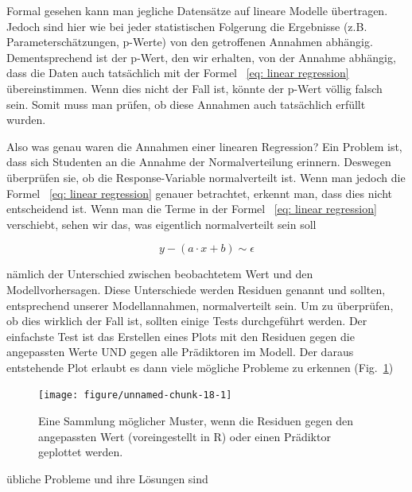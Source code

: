 \documentclass[a4paper,twoside]{tufte-book}\usepackage[]{graphicx}\usepackage[]{color}
\begin{document}
Formal gesehen kann man jegliche Datensätze auf lineare Modelle übertragen. Jedoch sind hier wie bei jeder statistischen Folgerung die Ergebnisse (z.B. Parameterschätzungen, p-Werte) von den getroffenen Annahmen abhängig. Dementsprechend ist der p-Wert, den wir erhalten, von der Annahme abhängig, dass die Daten auch tatsächlich mit der Formel ~\ref{eq: linear regression} übereinstimmen. Wenn dies nicht der Fall ist, könnte der p-Wert völlig falsch sein. Somit muss man prüfen, ob diese Annahmen auch tatsächlich erfüllt wurden.

Also was genau waren die Annahmen einer linearen Regression? Ein Problem ist, dass sich Studenten an die Annahme der Normalverteilung erinnern. Deswegen überprüfen sie, ob die Response-Variable normalverteilt ist. Wenn man jedoch die Formel ~\ref{eq: linear regression} genauer betrachtet, erkennt man, dass dies nicht entscheidend ist. Wenn man die Terme in der Formel ~\ref{eq: linear regression} verschiebt,
sehen wir das, was eigentlich normalverteilt sein soll

\begin{equation} \label{eq: linear regression}
y - (a \cdot x + b ) \sim \epsilon 
\end{equation}

nämlich der Unterschied zwischen beobachtetem Wert und den Modellvorhersagen. Diese Unterschiede werden Residuen genannt und sollten, entsprechend unserer Modellannahmen, normalverteilt sein. Um zu überprüfen, ob dies wirklich der Fall ist, sollten einige Tests durchgeführt werden. Der einfachste Test ist das Erstellen eines Plots mit den Residuen gegen die angepassten Werte UND gegen alle Prädiktoren im Modell. Der daraus entstehende Plot erlaubt es dann viele mögliche Probleme zu erkennen (Fig.~\ref{fig: ResidualPatterns})



\begin{figure}[htbp]
\begin{center}
\begin{Schunk}

\texttt{[image: figure/unnamed-chunk-18-1]} \end{Schunk}
\caption{Eine Sammlung möglicher Muster, wenn die Residuen gegen den angepassten Wert (voreingestellt in R) oder einen Prädiktor geplottet werden.}
\label{fig: ResidualPatterns}
\end{center}
\end{figure}

übliche Probleme und ihre Lösungen sind  
\end{document}
